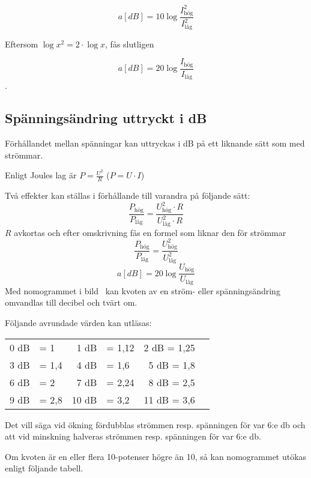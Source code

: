 \[a[dB] = 10\log \dfrac{I_{\text{hög}}^2}{I_{\text{låg}}^2}\]

Eftersom \(\log x^2 = 2 \cdot \log x\), fås slutligen

\[a[dB] = 20\log \dfrac{I_{\text{hög}}}{I_{\text{låg}}}\].

\subsection{Spänningsändring uttryckt i dB}

Förhållandet mellan spänningar kan uttryckas i dB på ett liknande sätt som med
strömmar.

Enligt Joules lag är \(P = \frac{U^2}{R}\) (\(P = U \cdot I\))

Två effekter kan ställas i förhållande till varandra på följande sätt:
\[\dfrac{P_{\text{hög}}}{P_{\text{låg}}}=\dfrac{U_{\text{hög}}^2 \cdot R}{U_{\text{låg}}^2 \cdot R}\]
\(R\) avkortas och efter omskrivning fås en formel som liknar den för strömmar
\[\dfrac{P_{\text{hög}}}{P_{\text{låg}}} = \dfrac{U_{\text{hög}}^2}{U_{\text{låg}}^2}\]
\[a[dB] = 20\log \dfrac{U_{\text{hög}}}{U_{\text{låg}}}\]
Med nomogrammet i bild~ kan kvoten av en
ström- eller spänningsändring omvandlas till decibel och tvärt om.


Följande avrundade värden kan utläsas:

\begin{center}
\begin{tabular}{rlrlrl}
0 dB & = 1   &  1 dB & = 1,12 &  2 dB = 1,25 \\
3 dB & = 1,4 &  4 dB & = 1,6  &  5 dB = 1,8 \\
6 dB & = 2   &  7 dB & = 2,24 &  8 dB = 2,5 \\
9 dB & = 2,8 & 10 dB & = 3,2  & 11 dB = 3,6
\end{tabular}
\end{center}

Det vill säga vid ökning fördubblas strömmen resp. spänningen för var 6:e
\unit{\decibel} och att vid minskning halveras strömmen resp. spänningen för var
6:e \unit{\decibel}.

Om kvoten är en eller flera 10-potenser högre än 10, så kan nomogrammet utökas
enligt följande tabell.

